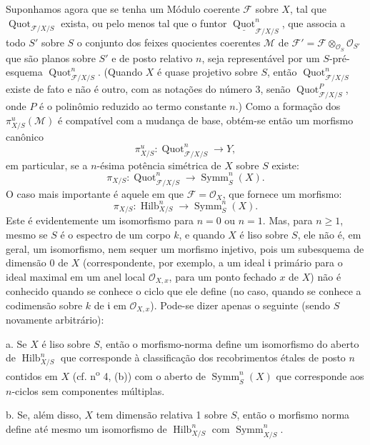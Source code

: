 \documentclass[11pt,twoside,openany]{book}
\numberwithin{equation}{section}
\newcommand{\src}[1]{%
  \phantomsection\hypertarget{src:#1}{}%
  \marginpar{\raggedleft\footnotesize\sffamily #1}%
}
\theoremstyle{plain}
\theoremstyle{definition}
\theoremstyle{remark}
\newcommand{\FgaUnitKey}{frontmatter}
\renewcommand{\src}[1]{%
  \phantomsection\hypertarget{src:\FgaUnitKey:#1}{}%
  \marginpar{\raggedleft\footnotesize\sffamily #1}%
}
\begin{document}
Suponhamos agora que se tenha um Módulo coerente $\mathcal F$ sobre $X$, tal
que $\operatorname{Quot}_{\mathcal F/X/S}$ exista, ou pelo menos tal que o
funtor $\underline{\operatorname{Quot}}^n_{\mathcal F/X/S}$, que associa a
todo $S'$ sobre $S$ o conjunto dos feixes quocientes coerentes $\mathcal M$ de
$\mathcal F'=\mathcal F\otimes_{\mathcal O_S}\mathcal O_{S'}$ que são planos
sobre $S'$ e de posto relativo $n$, seja representável por um $S$-pré-esquema
$\operatorname{Quot}^n_{\mathcal F/X/S}$. (Quando $X$ é quase projetivo sobre
$S$, então $\operatorname{Quot}^n_{\mathcal F/X/S}$ existe de fato e não é
outro, com as notações do número 3, senão
$\operatorname{Quot}^P_{\mathcal F/X/S}$, onde $P$ é o polinômio reduzido ao
termo constante $n$.) Como a formação dos $\pi^u_{X/S}(\mathcal M)$ é
compatível com a mudança de base, obtém-se então um morfismo canônico
\[
\pi^u_{X/S}:\operatorname{Quot}^n_{\mathcal F/X/S}\longrightarrow Y,
\]
em particular, se a $n$-ésima potência simétrica de $X$ sobre $S$ existe:
\[
\pi_{X/S}:\operatorname{Quot}^n_{\mathcal F/X/S}
\longrightarrow\operatorname{Symm}^n_S(X).
\]
O caso mais importante é aquele em que $\mathcal F=\mathcal O_X$, que fornece
um morfismo:
\[
\pi_{X/S}:\operatorname{Hilb}^n_{X/S}
\longrightarrow\operatorname{Symm}^n_S(X).
\]
Este é evidentemente um isomorfismo para $n=0$ ou $n=1$. Mas, para
$n\geq1$, mesmo se $S$ é o espectro
de um corpo $k$, e quando $X$ é liso sobre $S$, ele não é, em geral, um
isomorfismo, nem sequer um morfismo injetivo, pois um subesquema de dimensão 0
de $X$ (correspondente, por exemplo, a um ideal $\mathfrak i$ primário para o
ideal maximal em um anel local $\mathcal O_{X,x}$, para um ponto fechado $x$ de
$X$) não é conhecido quando se conhece o ciclo que ele define (no caso, quando
se conhece a codimensão sobre $k$ de $\mathfrak i$ em $\mathcal O_{X,x}$).
Pode-se dizer apenas o seguinte (sendo $S$ novamente arbitrário):

\medskip
\noindent a. Se $X$ é liso sobre $S$, então o morfismo-norma define um
isomorfismo do aberto de $\operatorname{Hilb}^n_{X/S}$ que corresponde à
classificação dos recobrimentos étales de posto $n$ contidos em $X$ (cf.
n\textsuperscript{o} 4, (b)) com o aberto de
$\operatorname{Symm}^n_S(X)$ que corresponde aos $n$-ciclos sem componentes
múltiplas.
\src{275}

\medskip
\noindent b. Se, além disso, $X$ tem dimensão relativa 1 sobre $S$, então o
morfismo norma define até mesmo um isomorfismo de
$\operatorname{Hilb}^n_{X/S}$ com $\operatorname{Symm}^n_{X/S}$.
\end{document}
